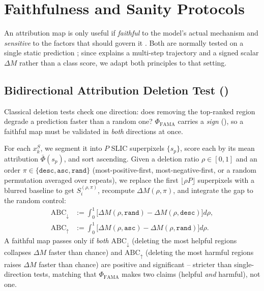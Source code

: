 \section{Faithfulness and Sanity Protocols}
\label{sec:protocols}

An attribution map is only useful if \emph{faithful} to the model's actual mechanism and \emph{sensitive} to the factors that should govern it \citep{eu2019trustworthy}. Both are normally tested on a single static prediction \citep{samek2016evaluating,petsiuk2018rise,adebayo2018sanity}; since \fama explains a multi-step trajectory and a signed scalar $\Delta M$ rather than a class score, we adapt both principles to that setting.

\subsection{Bidirectional Attribution Deletion Test (\biadt)}
\label{sec:biadt}

Classical deletion tests \citep{samek2016evaluating,petsiuk2018rise} check one direction: does removing the top-ranked region degrade a prediction faster than a random one? $\Phi_{\mathrm{FAMA}}$ carries a \emph{sign} (), so a faithful map must be validated in \emph{both} directions at once.

For each $x_k^S$, we segment it into $P$ SLIC superpixels \citep{achanta2012slic} $\{s_p\}$, score each by its mean attribution $\bar\Phi(s_p)$, and sort ascending. Given a deletion ratio $\rho\in[0,1]$ and an order $\pi\in\{\texttt{desc},\texttt{asc},\texttt{rand}\}$ (most-positive-first, most-negative-first, or a random permutation averaged over repeats), we replace the first $\lfloor\rho P\rfloor$ superpixels with a blurred baseline to get $S_i^{(\rho,\pi)}$, recompute $\Delta M(\rho,\pi)$, and integrate the gap to the random control:
\begin{equation}
\begin{split}
    \mathrm{ABC}_{\downarrow} &:= \textstyle\int_0^1\!\big[\Delta M(\rho,\texttt{rand}){-}\Delta M(\rho,\texttt{desc})\big]d\rho,\\
    \mathrm{ABC}_{\uparrow} &:= \textstyle\int_0^1\!\big[\Delta M(\rho,\texttt{asc}){-}\Delta M(\rho,\texttt{rand})\big]d\rho.
\end{split}
\label{eq:abc_metric}
\end{equation}
A faithful map passes \biadt only if \emph{both} $\mathrm{ABC}_\downarrow$ (deleting the most helpful regions collapses $\Delta M$ faster than chance) and $\mathrm{ABC}_\uparrow$ (deleting the most harmful regions raises $\Delta M$ faster than chance) are positive and significant -- stricter than single-direction tests, matching that $\Phi_{\mathrm{FAMA}}$ makes two claims (helpful \emph{and} harmful), not one.

